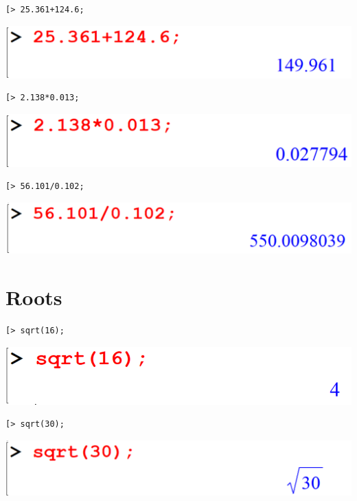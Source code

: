 \documentclass[
]{book}
\theoremstyle{definition}
\theoremstyle{definition}
\theoremstyle{definition}
\theoremstyle{definition}
\theoremstyle{remark}
\begin{document}
\begin{verbatim}
[> 25.361+124.6;
\end{verbatim}

\includegraphics{figures/Lesson 1/fig24.png}

\begin{verbatim}
[> 2.138*0.013;
\end{verbatim}

\includegraphics{figures/Lesson 1/fig25.png}

\begin{verbatim}
[> 56.101/0.102;
\end{verbatim}

\includegraphics{figures/Lesson 1/fig26.png}

\section{Roots}\label{roots-1}

\begin{verbatim}
[> sqrt(16);
\end{verbatim}

\includegraphics{figures/Lesson 1/fig27.png}

\begin{verbatim}
[> sqrt(30);
\end{verbatim}

\includegraphics{figures/Lesson 1/fig28.png}
\end{document}
